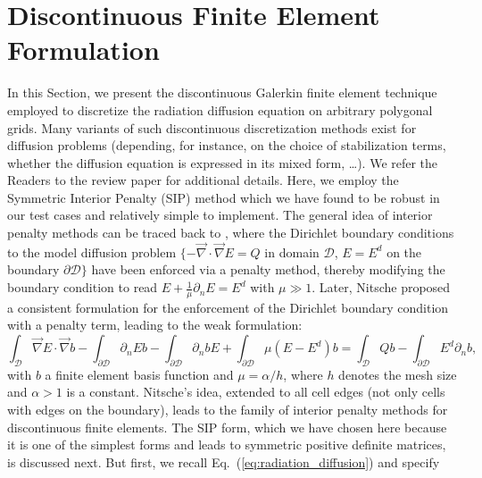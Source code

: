 \documentclass[preprint,10pt]{elsarticle}
\renewcommand{\div}{\vec{\nabla}\! \cdot \!}
\newcommand{\grad}{\vec{\nabla}}
\newcommand{\D}{\mathcal{D}}
\newcommand{\eqt}[1]{Eq.~(\ref{#1})}                     %
\newcommand{\tf}{b}
\begin{document}
\section{Discontinuous Finite Element Formulation} \label{sec:ip}

In this Section, we present the discontinuous Galerkin finite element technique employed to
discretize the radiation diffusion equation on arbitrary polygonal grids. Many variants of such discontinuous discretization
methods exist for diffusion problems (depending, for instance, on the choice of stabilization terms, whether 
the diffusion equation is expressed in its mixed form, \ldots). We refer the Readers to the review
paper \cite{DouglasN.Arnold2002} for additional details. Here, we employ the Symmetric
Interior Penalty (SIP) method which we have found to be robust in our test cases and relatively simple 
to implement.
The general idea of interior penalty methods can be traced back to \cite{lions1968}, where the Dirichlet
boundary conditions to the model diffusion problem $\{-\div \grad E = Q$ in domain $\D$, $E=E^d$ on 
the boundary $\partial \D\}$ have been enforced via a penalty method, thereby modifying the 
boundary condition to read $E+\frac{1}{\mu}\partial_n E = E^d$ with $\mu\gg 1$. Later, 
Nitsche \cite{nitsche1971} proposed a consistent formulation for the enforcement of the 
Dirichlet boundary condition with a penalty term, leading to the weak formulation:
\begin{equation}
\label{eq:penalty_nitsche_bd_only}
\int_{\D} \grad E \cdot \grad \tf
- \int_{\partial\D} \partial_n E \tf  
- \int_{\partial\D} \partial_n \tf E 
+ \int_{\partial\D} \mu(E-E^d) \tf 
=
\int_{\D} Q \tf 
- \int_{\partial\D} E^d \partial_n \tf ,
\end{equation}
with $\tf$ a finite element basis function and $\mu=\alpha/h$, where $h$ denotes 
the mesh size and $\alpha>1$ is a constant.
%
Nitsche's idea, extended to all cell edges (not only cells with edges on the boundary), leads
to the family of interior penalty methods for discontinuous finite elements. The SIP form,
which we have chosen here because it is one of the simplest forms and leads to symmetric 
positive definite matrices, is discussed next. 
%
But first, we recall \eqt{eq:radiation_diffusion} and specify 
\end{document}

